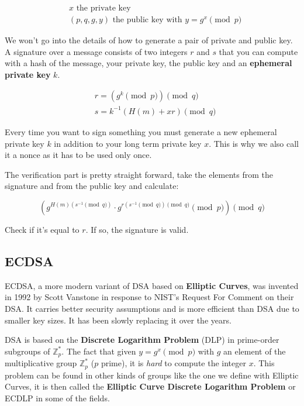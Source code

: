 \documentclass[a4paper,11pt]{article}
\begin{document}
\begin{align*}
&x \text{ the private key} \\
&(p, q, g, y) \text{ the public key with } y = g^x \pmod{p}
\end{align*}

We won't go into the details of how to generate a pair of private and public key. A signature over a message consists of two integers $r$ and $s$ that you can compute with a hash of the message, your private key, the public key and an \textbf{ephemeral private key} $k$.

\begin{align*}
&r = (g^k \pmod{p}) \pmod{q}\\
&s = k^{-1} ( H(m) + x r ) \pmod{q}
\end{align*}

Every time you want to sign something you must generate a new ephemeral private key $k$ in addition to your long term private key $x$. This is why we also call it a nonce as it has to be used only once.

The verification part is pretty straight forward, take the elements from the signature and from the public key and calculate:

$$ (g^{H(m) (s^{-1} \pmod{q})} \cdot g^{r (s^{-1} \pmod{q}) \pmod{q}} \pmod{p}) \pmod{q} $$

Check if it's equal to $r$. If so, the signature is valid.

\subsection{ECDSA}\label{ecdsa}

ECDSA, a more modern variant of DSA based on \textbf{Elliptic Curves}, was invented in 1992 by Scott Vanstone in response to NIST's Request For Comment on their DSA\cite{ecdsa}. It carries better security assumptions and is more efficient than DSA due to smaller key sizes. It has been slowly replacing it over the years.

DSA is based on the \textbf{Discrete Logarithm Problem} (DLP) in prime-order subgroups of $\mathbb{Z}^{\ast}_p$. The fact that given $y = g^x \pmod{p}$ with $g$ an element of the multiplicative group $\mathbb{Z}_{p}^{\ast}$ ($p$ prime), it is \emph{hard} to compute the integer $x$. This problem can be found in other kinds of groups like the one we define with Elliptic Curves, it is then called the \textbf{Elliptic Curve Discrete Logarithm Problem} or ECDLP in some of the fields.\\
\end{document}
